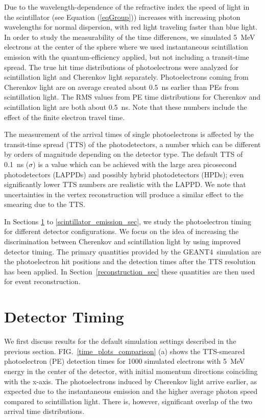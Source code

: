 \documentclass[aps,prc,twocolumn,groupedaddress,showpacs,amsmath,amssymb,floatfix,superscriptaddress]{revtex4}
\newcommand{\GEANT}{GEANT4}
\begin{document}
Due to the wavelength-dependence of the refractive index the speed of
light in the scintillator (see Equation (\ref{eqGroup})) increases
with increasing photon wavelengths for normal dispersion, with red
light traveling faster than blue light.  In order to study the
measurability of the time differences, we simulated 5~MeV electrons at
the center of the sphere where we used instantaneous scintillation
emission with the quantum-efficiency applied, but not including a
transit-time spread. The true hit time distributions of photoelectrons
were analyzed for scintillation light and Cherenkov light
separately. Photoelectrons coming from Cherenkov light are on average
created about 0.5~ns earlier than PEs from scintillation light. The
RMS values from PE time distributions for Cherenkov and scintillation
light are both about 0.5~ns. Note that these numbers include the
effect of the finite electron travel time.

The measurement of the arrival times of single photoelectrons is
affected by the transit-time spread (TTS) of the photodetectors, a
number which can be different by orders of magnitude depending on the
detector type. The default TTS of 0.1~ns ($\sigma$) is a value which
can be achieved with the large area picosecond photodetectors
(LAPPDs)\cite{LAPPDSum,LAPPDTDR} and possibly hybrid photodetectors
(HPDs)\cite{hpdThesis}; even significantly lower TTS numbers are
realistic with the LAPPD\cite{RSI_paper,PSEC4_paper,anode_paper}. We
note that uncertainties in the vertex reconstruction will produce a
similar effect to the smearing due to the TTS.

In Sections \ref{detector_timing_sec} to
\ref{scintillator_emission_sec}, we study the
photoelectron timing for different detector configurations. We focus
on the idea of increasing the discrimination between Cherenkov and
scintillation light by using improved detector timing. The primary
quantities provided by the \GEANT~simulation are the photoelectron hit
positions and the detection times after the TTS resolution has been
applied. In Section~\ref{reconstruction_sec} these quantities are then
used for event reconstruction.

\section{Detector Timing}
\label{detector_timing_sec}

We first discuss results for the default simulation settings described
in the previous section. FIG.~\ref{time_plots_comparison} (a) shows
the TTS-smeared photoelectron (PE) detection times for 1000 simulated
electrons with 5~MeV energy in the center of the detector, with initial
momentum directions coinciding with the x-axis. The photoelectrons
induced by Cherenkov light arrive earlier, as expected due to the
instantaneous emission and the higher average photon speed compared to
scintillation light. There is, however, significant overlap of the two
arrival time distributions.
\end{document}

